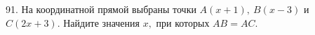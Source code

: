 91. На координатной прямой выбраны точки $A(x + 1),\ B(x - 3)$ и $C(2x + 3).$ Найдите значения $x,$ при которых $AB = AC.$\\
